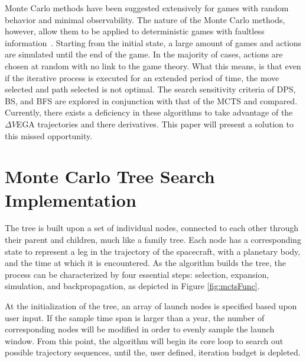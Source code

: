\documentclass[letterpaper, preprint, paper,11pt]{AAS}	%
\newcommand*\circled[1]{\tikz[baseline=(char.base)]{
            \node[shape=circle,draw,inner sep=0.8pt] (char) {#1};}}
\begin{document}
Monte Carlo methods have been suggested extensively for games with random behavior and minimal observability. The nature of the Monte Carlo methods, however, allow them to be applied to deterministic games with faultless information~\cite{Browne2012}. Starting from the initial state, a large amount of games and actions are simulated until the end of the game. In the majority of cases, actions are chosen at random with no link to the game theory. What this means, is that even if the iterative process is executed for an extended period of time, the move selected and path selected is not optimal. The search sensitivity criteria of DPS, BS, and BFS are explored in conjunction with that of the MCTS and compared. Currently, there exists a deficiency in these algorithms to take advantage of the $\Delta V$EGA trajectories and there derivatives. This paper will present a solution to this missed opportunity.

\section*{Monte Carlo Tree Search Implementation}

The tree is built upon a set of individual nodes, connected to each other through their parent and children, much like a family tree. Each node has a corresponding state to represent a leg in the trajectory of the spacecraft, with a planetary body, and the time at which it is encountered. As the algorithm builds the tree, the process can be characterized by four essential steps: \circled{1} selection, \circled{2} expansion, \circled{3} simulation, and \circled{4} backpropagation, as depicted in Figure \ref*{fig:mctsFunc}.

At the initialization of the tree, an array of launch nodes is specified based upon user input. If the sample time span is larger than a year, the number of corresponding nodes will be modified in order to evenly sample the launch window. From this point, the algorithm will begin its core loop to search out possible trajectory sequences, until the, user defined, iteration budget is depleted.
\end{document}
